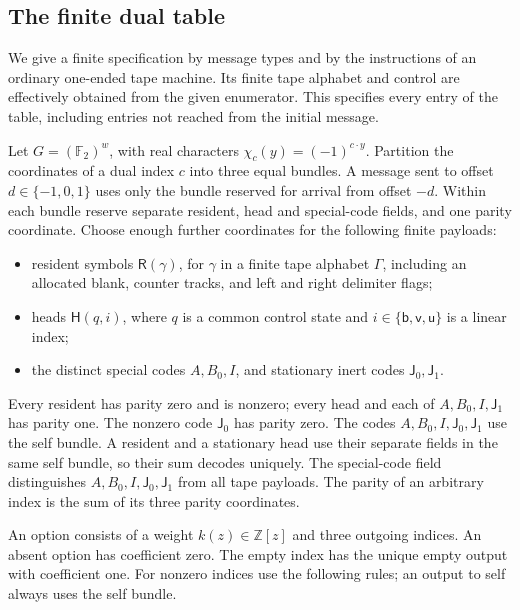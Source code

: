 \subsection{The finite dual table}\label{sec:dual-table}

We give a finite specification by message types and by the instructions of an ordinary one-ended tape machine. Its finite tape alphabet and control are effectively obtained from the given enumerator. This specifies every entry of the table, including entries not reached from the initial message.

Let \(G=(\mathbb F_2)^w\), with real characters \(\chi_c(y)=(-1)^{c\cdot y}\). Partition the coordinates of a dual index \(c\) into three equal bundles. A message sent to offset \(d\in\{-1,0,1\}\) uses only the bundle reserved for arrival from offset \(-d\). Within each bundle reserve separate resident, head and special-code fields, and one parity coordinate. Choose enough further coordinates for the following finite payloads:
\begin{itemize}
\item resident symbols \(\mathsf R(\gamma)\), for \(\gamma\) in a finite tape alphabet \(\Gamma\), including an allocated blank, counter tracks, and left and right delimiter flags;
\item heads \(\mathsf H(q,i)\), where \(q\) is a common control state and \(i\in\{\mathsf b,\mathsf v,\mathsf u\}\) is a linear index;
\item the distinct special codes \(A,B_0,I\), and stationary inert codes \(\mathsf J_0,\mathsf J_1\).
\end{itemize}
Every resident has parity zero and is nonzero; every head and each of \(A,B_0,I,\mathsf J_1\) has parity one. The nonzero code \(\mathsf J_0\) has parity zero. The codes \(A,B_0,I,\mathsf J_0,\mathsf J_1\) use the self bundle. A resident and a stationary head use their separate fields in the same self bundle, so their sum decodes uniquely. The special-code field distinguishes \(A,B_0,I,\mathsf J_0,\mathsf J_1\) from all tape payloads. The parity of an arbitrary index is the sum of its three parity coordinates.

An option consists of a weight \(k(z)\in\mathbb Z[z]\) and three outgoing indices. An absent option has coefficient zero. The empty index has the unique empty output with coefficient one. For nonzero indices use the following rules; an output to self always uses the self bundle.

